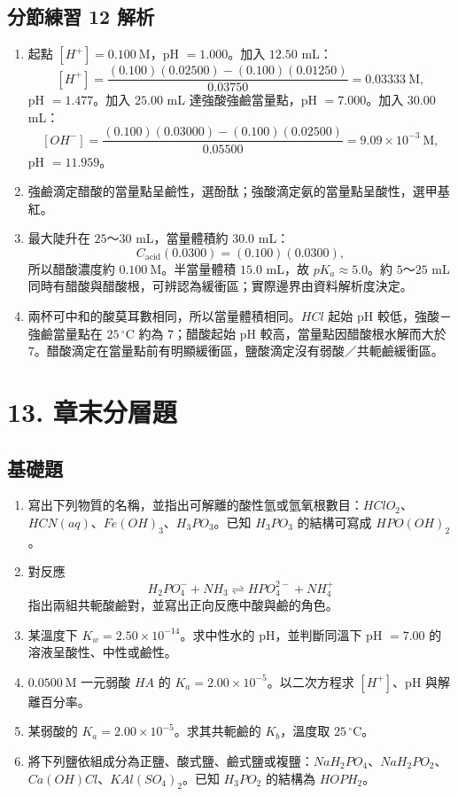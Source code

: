 \documentclass[11pt,a4paper]{article}
\providecommand{\tightlist}{%
  \setlength{\itemsep}{0pt}\setlength{\parskip}{0pt}}
\begin{document}
\subsection{分節練習 12 解析}\label{ux5206ux7bc0ux7df4ux7fd2-12-ux89e3ux6790}

\begin{enumerate}
\def\labelenumi{\arabic{enumi}.}
\tightlist
\item
  起點 \([H^+]=0.100\ \mathrm M\)，pH \(=1.000\)。加入 \(12.50\) mL：
  \[
  [H^+]=\frac{(0.100)(0.02500)-(0.100)(0.01250)}
  {0.03750}
  =0.03333\ \mathrm M,
  \]
  pH \(=1.477\)。加入 \(25.00\) mL 達強酸強鹼當量點，pH \(=7.000\)。加入 \(30.00\) mL：
  \[
  [OH^-]=\frac{(0.100)(0.03000)-(0.100)(0.02500)}
  {0.05500}
  =9.09\times10^{-3}\ \mathrm M,
  \]
  pH \(=11.959\)。
\item
  強鹼滴定醋酸的當量點呈鹼性，選酚酞；強酸滴定氨的當量點呈酸性，選甲基紅。
\item
  最大陡升在 \(25\)～\(30\) mL，當量體積約 \(30.0\) mL：
  \[
  C_{\mathrm{acid}}(0.0300)=(0.100)(0.0300),
  \]
  所以醋酸濃度約 \(0.100\ \mathrm M\)。半當量體積 \(15.0\) mL，故 \(pK_a\approx5.0\)。約 \(5\)～\(25\) mL 同時有醋酸與醋酸根，可辨認為緩衝區；實際邊界由資料解析度決定。
\item
  兩杯可中和的酸莫耳數相同，所以當量體積相同。\(HCl\) 起始 pH 較低，強酸－強鹼當量點在 \(25\,^\circ\mathrm C\) 約為 \(7\)；醋酸起始 pH 較高，當量點因醋酸根水解而大於 \(7\)。醋酸滴定在當量點前有明顯緩衝區，鹽酸滴定沒有弱酸／共軛鹼緩衝區。
\end{enumerate}

\section{13. 章末分層題}\label{ux7ae0ux672bux5206ux5c64ux984c}

\subsection{基礎題}\label{ux57faux790eux984c}

\begin{enumerate}
\def\labelenumi{\arabic{enumi}.}
\item
  寫出下列物質的名稱，並指出可解離的酸性氫或氫氧根數目：\(HClO_2\)、\(HCN(aq)\)、\(Fe(OH)_3\)、\(H_3PO_3\)。已知 \(H_3PO_3\) 的結構可寫成 \(HPO(OH)_2\)。
\item
  對反應
  \[
  H_2PO_4^-+NH_3\rightleftharpoons HPO_4^{2-}+NH_4^+
  \]
  指出兩組共軛酸鹼對，並寫出正向反應中酸與鹼的角色。
\item
  某溫度下 \(K_w=2.50\times10^{-14}\)。求中性水的 pH，並判斷同溫下 pH \(=7.00\) 的溶液呈酸性、中性或鹼性。
\item
  \(0.0500\ \mathrm M\) 一元弱酸 \(HA\) 的 \(K_a=2.00\times10^{-5}\)。以二次方程求 \([H^+]\)、pH 與解離百分率。
\item
  某弱酸的 \(K_a=2.00\times10^{-5}\)。求其共軛鹼的 \(K_b\)，溫度取 \(25\,^\circ\mathrm C\)。
\item
  將下列鹽依組成分為正鹽、酸式鹽、鹼式鹽或複鹽：\(NaH_2PO_4\)、\(NaH_2PO_2\)、\(Ca(OH)Cl\)、\(KAl(SO_4)_2\)。已知 \(H_3PO_2\) 的結構為 \(HOPH_2\)。
\end{enumerate}
\end{document}
